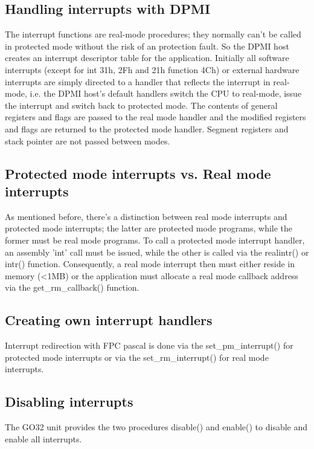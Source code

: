 \subsection{Handling interrupts with DPMI}
The interrupt functions are real-mode procedures; they normally can't be
called in protected mode without the risk of an protection fault. So the
DPMI host creates an interrupt descriptor table for the application.
Initially all software interrupts (except for int 31h, 2Fh and 21h function
4Ch) or external hardware interrupts are simply directed to a handler that
reflects the interrupt in real-mode, i.e. the DPMI host's default handlers
switch the CPU to real-mode, issue the interrupt and switch back to
protected mode. The contents of general registers and flags are passed to
the real mode handler and the modified registers and flags are returned to
the protected mode handler. Segment registers and stack pointer are not
passed between modes.
\subsection{Protected mode interrupts vs. Real mode interrupts}
As mentioned before, there's a distinction between real mode interrupts and
protected mode interrupts; the latter are protected mode programs, while the
former must be real mode programs. To call a protected mode interrupt
handler, an assembly 'int' call must be issued, while the other is called
via the realintr() or intr() function. Consequently, a real mode interrupt
then must either reside in \dos memory (<1MB) or the application must
allocate a real mode callback address via the get\_rm\_callback() function.
\subsection{Creating own interrupt handlers}
Interrupt redirection with FPC pascal is done via the set\_pm\_interrupt() for
protected mode interrupts or via the set\_rm\_interrupt() for real mode
interrupts.
\subsection{Disabling interrupts}
The GO32 unit provides the two procedures disable() and enable() to disable
and enable all interrupts.
